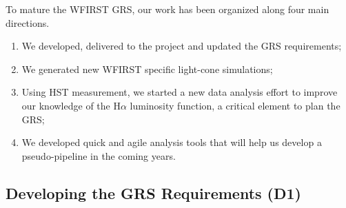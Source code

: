 







\begin{summary}
To mature the WFIRST GRS, our work has been organized along four main directions.
\begin{enumerate}
\item We developed, delivered to the project and updated the GRS requirements;
\item We generated new WFIRST specific light-cone simulations;
\item Using HST measurement, we started a new data analysis effort to improve our knowledge of the H$\alpha$ luminosity function, a critical element to plan the GRS;
\item We developed quick and agile analysis tools that will help us develop a pseudo-pipeline in the coming years.
\end{enumerate}
\end{summary}


 \subsection{Developing the GRS Requirements (D1)}

